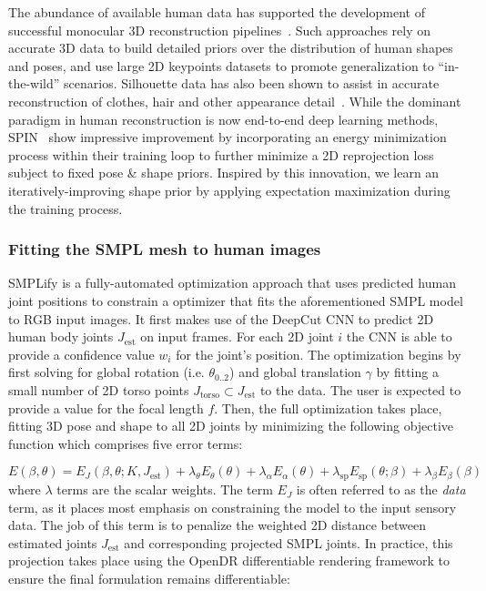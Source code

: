 The abundance of available human data has supported the development of successful monocular 3D reconstruction pipelines~\cite{kolotouros19convolutional,kanazawa18end-to-end}. Such approaches rely on accurate 3D data to build detailed priors over the distribution of human shapes and poses, and use large 2D keypoints datasets to promote generalization to ``in-the-wild'' scenarios. Silhouette data has also been shown to assist in accurate reconstruction of clothes, hair and other appearance detail~\cite{pifuSHNMKL19,alldieck2019learning}.
While the dominant paradigm in human reconstruction is now end-to-end deep learning methods, SPIN~\cite{kolotouros19learning} show impressive improvement by incorporating an energy minimization process within their training loop to further minimize a 2D reprojection loss subject to fixed pose \& shape priors. Inspired by this innovation, we learn an iteratively-improving shape prior by applying expectation maximization 
during the training process.

\subsubsection{Fitting the SMPL mesh to human images}
SMPLify \cite{bogo16keep} is a fully-automated optimization approach that uses predicted human joint positions to constrain a optimizer that fits the aforementioned SMPL model to RGB input images. It first makes use of the DeepCut CNN to predict 2D human body joints $J_{\text{est}}$ on input frames. For each 2D joint $i$ the CNN is able to provide a confidence value $w_i$ for the joint's position. The optimization begins by first solving for global rotation (i.e. $\theta_{0..2}$) and global translation $\gamma$ by fitting a small number of 2D torso points $J_{\text{torso}} \subset J_{\text{est}}$ to the data. The user is expected to provide a value for the focal length $f$. Then, the full optimization takes place, fitting 3D pose and shape to all 2D joints by minimizing the following objective function which comprises five error terms:

\begin{equation}
E(\beta, \theta) = E_{J}(\beta, \theta; K, J_{\text{est}}) + \lambda_{\theta}E_{\theta}(\theta) + \lambda_{\alpha}E_{\alpha}(\theta) + \lambda_{\text{sp}}E_{\text{sp}}(\theta; \beta) + \lambda_{\beta}E_{\beta}(\beta)
\end{equation}
where $\lambda$ terms are the scalar weights. The term $E_{J}$ is often referred to as the \textit{data} term, as it places most emphasis on constraining the model to the input sensory data. The job of this term is to penalize the weighted 2D distance between estimated joints $J_{\text{est}}$ and corresponding projected SMPL joints. In practice, this projection takes place using the OpenDR differentiable rendering framework to ensure the final formulation remains differentiable:

